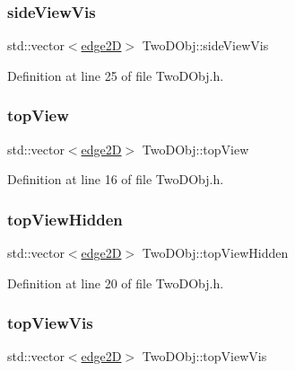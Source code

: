 \subsubsection{\texorpdfstring{side\+View\+Vis}{sideViewVis}}
{\footnotesize\ttfamily std\+::vector$<$\mbox{\hyperlink{structedge2_d}{edge2D}}$>$ Two\+D\+Obj\+::side\+View\+Vis}



Definition at line 25 of file Two\+D\+Obj.\+h.

\mbox{\label{class_two_d_obj_a041112b9394b373175014e92e7e1f9b6}} 
\subsubsection{\texorpdfstring{top\+View}{topView}}
{\footnotesize\ttfamily std\+::vector$<$\mbox{\hyperlink{structedge2_d}{edge2D}}$>$ Two\+D\+Obj\+::top\+View}



Definition at line 16 of file Two\+D\+Obj.\+h.

\mbox{\label{class_two_d_obj_a9de9704547d680c52850966a7b6397f8}} 
\subsubsection{\texorpdfstring{top\+View\+Hidden}{topViewHidden}}
{\footnotesize\ttfamily std\+::vector$<$\mbox{\hyperlink{structedge2_d}{edge2D}}$>$ Two\+D\+Obj\+::top\+View\+Hidden}



Definition at line 20 of file Two\+D\+Obj.\+h.

\mbox{\label{class_two_d_obj_a2e594bbab7f3d884c05301f11c84de8e}} 
\subsubsection{\texorpdfstring{top\+View\+Vis}{topViewVis}}
{\footnotesize\ttfamily std\+::vector$<$\mbox{\hyperlink{structedge2_d}{edge2D}}$>$ Two\+D\+Obj\+::top\+View\+Vis}



